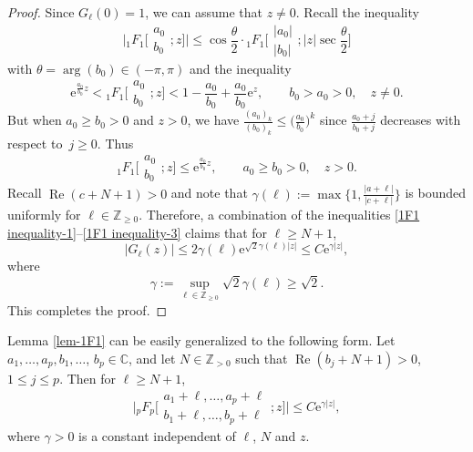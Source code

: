 \documentclass[11pt]{article}
\numberwithin{equation}{section}
\numberwithin{equation}{section}
\newcommand{\CC}{\ensuremath{\mathbb{C}}}
\newcommand{\ZZ}{\ensuremath{\mathbb{Z}}}
\newcommand{\me}{\mathrm{e}}
\begin{document}
\begin{proof}
	Since $G_{\ell}(0)=1$, we can assume that $z\ne 0$. Recall the inequality \cite[equation~(2.3)]{Joshi_Arya-1982}
	\begin{equation}\label{1F1 inequality-1}
		\biggl|{}_1F_1\bigg[\begin{matrix}
			a_0\\
			b_0
		\end{matrix};z\bigg]\biggr|\leqslant \cos\frac{\theta}{2}\cdot
		{}_1F_1\biggl[\begin{matrix}
			|a_0|\\
			|b_0|
		\end{matrix};|z|\sec\frac{\theta}{2}\bigg]
	\end{equation}
	with $\theta=\arg(b_0)\in (-\pi,\pi)$ and the inequality \cite[p. 37, equation~(3.5)]{Carlson-1966}
	\begin{equation}\label{1F1 inequality-2}
		\me^{\frac{a_0}{b_0}z}<{}_1F_1\biggl[\begin{matrix}
			a_0\\
			b_0
		\end{matrix};z\biggr]<1-\frac{a_0}{b_0}+\frac{a_0}{b_0}\me^z,\qquad b_0>a_0>0,\quad z\ne 0.
	\end{equation}
	But when $a_0\geqslant b_0>0$ and $z>0$, we have $\frac{(a_0)_k}{(b_0)_k}\leqslant \big(\frac{a_0}{b_0}\big)^k$ since $\frac{a_0+j}{b_0+j}$ decreases with respect to~${j\geqslant 0}$. Thus
	\begin{equation}\label{1F1 inequality-3}
		{}_1F_1\biggl[\begin{matrix}
			a_0\\
			b_0
		\end{matrix};z\biggr]\leqslant\me^{\frac{a_0}{b_0}z},\qquad a_0\geqslant b_0>0,\quad z>0.
	\end{equation}
	Recall $\operatorname{Re}(c+N+1)>0$ and note that $\gamma(\ell):=\max\bigl\{1,\frac{|a+\ell|}{|c+\ell|}\bigr\}$ is bounded uniformly for $\ell\in\ZZ_{\geqslant 0}$. Therefore, a combination of the inequalities \eqref{1F1 inequality-1}--\eqref{1F1 inequality-3} claims that for $\ell\geqslant N+1$,
	\[|G_\ell(z)|\leqslant 2\gamma(\ell)\me^{\sqrt{2}\gamma(\ell)|z|}\leqslant C\me^{\gamma|z|},\]
	where
	\[\gamma:=\sup_{\ell\in\ZZ_{\geqslant 0}}\sqrt{2}\gamma(\ell)\geqslant \sqrt{2}.\]
	This completes the proof.
\end{proof}

\begin{Remark}
	Lemma \ref{lem-1F1} can be easily generalized to the following form. Let $a_1,\dots,a_p,b_1,\dots$, $b_p\in\CC$, and let $N\in\ZZ_{>0}$ such that $\operatorname{Re}(b_j+N+1)>0$, $1\leqslant j\leqslant p$. Then for $\ell\geqslant N+1$,
		\begin{equation}\label{pFp estimate}
			\biggl|{}_pF_p\biggl[\begin{matrix}
				a_1+\ell,\dots,a_p+\ell\\
				b_1+\ell,\dots,b_p+\ell
			\end{matrix};z\biggr]\biggr|\leqslant C\me^{\gamma|z|},
		\end{equation}
		where $\gamma>0$ is a constant independent of $\ell$, $N$ and $z$.
\end{Remark}
\end{document}
